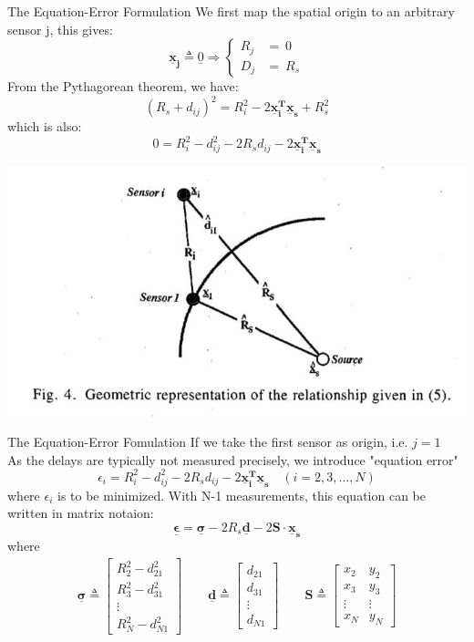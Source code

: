 \documentclass[10pt]{beamer}
\begin{document}
\begin{frame}{The Equation-Error Formulation}
  We first map the spatial origin to an arbitrary sensor j, this gives:
  $$ \mathbf{\underline{x}_{j}}\triangleq \underline{0}\Longrightarrow \begin{cases} R_{j} &= \ 0 \\ D_{j} &= \ R_{s} \end{cases}$$
  From the Pythagorean theorem, we have:
  $$(R_{s}+d_{ij})^2 = R_{i}^2 - 2\mathbf{\underline{x}_{i}^T \underline{x}_{s}} + R_{s}^2 $$
  which is also:
  $$ 0 = R_{i}^2 - d_{ij}^2 -2R_{s}d_{ij} - 2\mathbf{\underline{x}_{i}^T \underline{x}_{s}} $$
  \begin{center}
  \includegraphics[scale=0.7]{img/Pythagorean.JPG}
  \end{center}
\end{frame}
\begin{frame}{The Equation-Error Fomulation}
  If we take the first sensor as origin, i.e. $j=1$ \\
  As the delays are typically not measured precisely, we introduce "equation error"
  $$ \epsilon_{i} = R_{i}^2 - d_{ij}^2 -2R_{s}d_{ij} - 2\mathbf{\underline{x}_{i}^T \underline{x}_{s}} \quad (i=2,3,\ldots,N) $$
  where $\epsilon_{i}$ is to be minimized.
  With N-1 measurements, this equation can be written in matrix notaion:
  $$ \boldsymbol{\underline{\epsilon}} = \boldsymbol{\underline{\sigma}} - 2R_{s}\mathbf{\underline{d}} - 2 \mathbf{ S \cdot \underline{x}_{s}} $$
  where
  \begin{align*}
    \boldsymbol{\underline{\sigma}} \triangleq \begin{bmatrix} R_{2}^2 - d_{21}^2 \\ R_{3}^2 - d_{31}^2 \\ \vdots \\ R_{N}^2 - d_{N1}^2 \end{bmatrix} \qquad
    \mathbf{\underline{d}}      \triangleq \begin{bmatrix} d_{21}\\ d_{31} \\ \vdots \\ d_{N1} \end{bmatrix} \qquad
    \mathbf{S} \triangleq \begin{bmatrix} x_2 & y_2 \\x_3 & y_3\\ \vdots & \vdots \\ x_N & y_N \end{bmatrix}
  \end{align*}
\end{frame}
\end{document}
